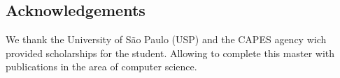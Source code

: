 \documentclass[40pt, a0, portrait]{a0poster}
\begin{document}
\begin{multicols}{2}

\section*{Acknowledgements}

We thank the University of São Paulo (USP) and the CAPES agency wich provided scholarships for the student. Allowing to complete this master with publications in the area of computer science.


\end{multicols}
\end{document}

